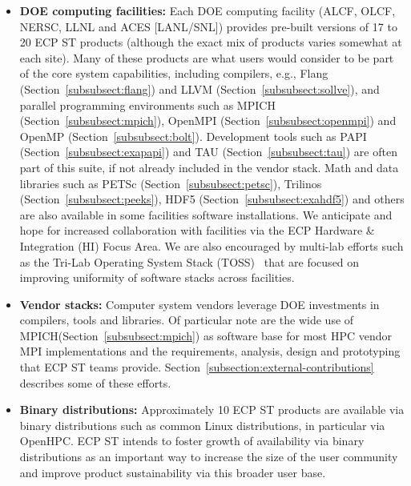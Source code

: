 \begin{itemize}
	\item \textbf{DOE computing facilities:} Each DOE computing facility (ALCF, OLCF, NERSC, LLNL and ACES [LANL/SNL]) provides pre-built versions of 17 to 20 ECP ST products (although the exact mix of products varies somewhat at each site).  Many of these products are what users would consider to be part of the core system capabilities, including compilers, e.g., Flang (Section~\ref{subsubsect:flang}) and LLVM (Section~\ref{subsubsect:sollve}), and parallel programming environments such as MPICH (Section~\ref{subsubsect:mpich}), OpenMPI (Section~\ref{subsubsect:openmpi}) and OpenMP (Section~\ref{subsubsect:bolt}).  Development tools such as PAPI (Section~\ref{subsubsect:exapapi}) and TAU (Section~\ref{subsubsect:tau}) are often part of this suite, if not already included in the vendor stack. Math and data libraries such as PETSc (Section~\ref{subsubsect:petsc}), Trilinos (Section~\ref{subsubsect:peeks}), HDF5 (Section~\ref{subsubsect:exahdf5}) and others are also available in some facilities software installations.  We anticipate and hope for increased collaboration with facilities via the ECP Hardware \& Integration (HI) Focus Area.  We are also encouraged by multi-lab efforts such as the Tri-Lab Operating System Stack (TOSS)~\cite{TOSS} that are focused on improving uniformity of software stacks across facilities.
	\item \textbf{Vendor stacks:} Computer system vendors leverage DOE investments in compilers, tools and libraries.  Of particular note are the wide use of MPICH(Section~\ref{subsubsect:mpich}) as software base for most HPC vendor MPI implementations and the requirements, analysis, design and prototyping that ECP ST teams provide.  Section~\ref{subsection:external-contributions} describes some of these efforts.
	\item \textbf{Binary distributions:} Approximately 10 ECP ST products are available via binary distributions such as common Linux distributions, in particular via OpenHPC\cite{OpenHPC}.  ECP ST intends to foster growth of availability via binary distributions as an important way to increase the size of the user community and improve product sustainability via this broader user base.
\end{itemize}

